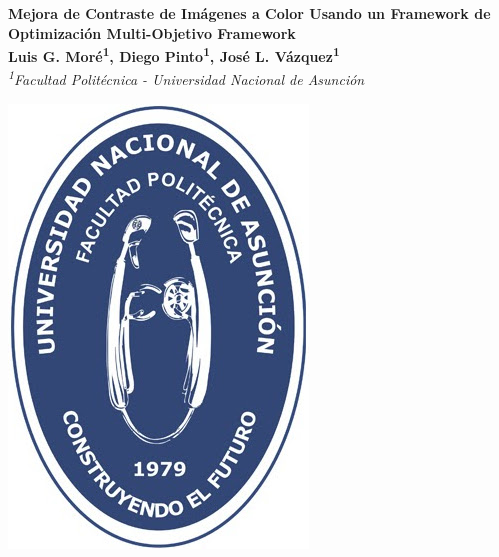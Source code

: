 \documentclass[a0,portrait,spanish,20pt]{a0poster}
\begin{document}

 
\begin{minipage}[b]{1\linewidth}
\begin{minipage}{0.60\linewidth}
\begin{shaded}
\centering
\Huge \color{White}  \textbf{Mejora de Contraste de Imágenes a Color Usando un Framework de Optimización Multi-Objetivo
Framework}\\ [0.5cm]%
\Large \textbf{Luis G. Moré\textsuperscript{1}, Diego Pinto\textsuperscript{1}, José L. Vázquez\textsuperscript{1}} \\ 
\Large \textit{\textsuperscript{1}Facultad Politécnica - Universidad Nacional de Asunción}
\end{shaded}
\end{minipage}
\hspace*{1cm}
\begin{minipage}{0.15\linewidth}
\includegraphics[width=1\columnwidth]{figures/photo.jpg}

\end{minipage}
\end{minipage}
\end{document}
